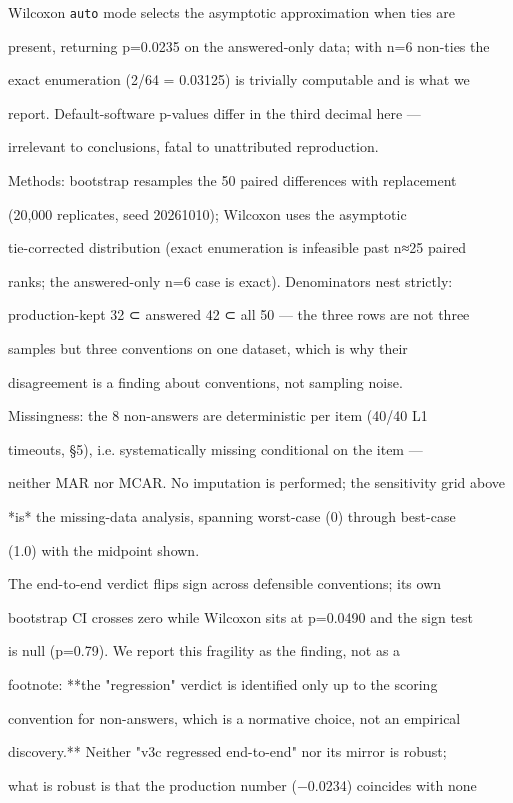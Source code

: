 \documentclass[11pt,a4paper]{article}
\begin{document}
Wilcoxon \texttt{auto} mode selects the asymptotic approximation when ties are

present, returning p=0.0235 on the answered-only data; with n=6 non-ties the

exact enumeration (2/64 = 0.03125) is trivially computable and is what we

report. Default-software p-values differ in the third decimal here —

irrelevant to conclusions, fatal to unattributed reproduction.

Methods: bootstrap resamples the 50 paired differences with replacement

(20,000 replicates, seed 20261010); Wilcoxon uses the asymptotic

tie-corrected distribution (exact enumeration is infeasible past n≈25 paired

ranks; the answered-only n=6 case is exact). Denominators nest strictly:

production-kept 32 ⊂ answered 42 ⊂ all 50 — the three rows are not three

samples but three conventions on one dataset, which is why their

disagreement is a finding about conventions, not sampling noise.

Missingness: the 8 non-answers are deterministic per item (40/40 L1

timeouts, §5), i.e. systematically missing conditional on the item —

neither MAR nor MCAR. No imputation is performed; the sensitivity grid above

*is* the missing-data analysis, spanning worst-case (0) through best-case

(1.0) with the midpoint shown.

The end-to-end verdict flips sign across defensible conventions; its own

bootstrap CI crosses zero while Wilcoxon sits at p=0.0490 and the sign test

is null (p=0.79). We report this fragility as the finding, not as a

footnote: **the "regression" verdict is identified only up to the scoring

convention for non-answers, which is a normative choice, not an empirical

discovery.** Neither "v3c regressed end-to-end" nor its mirror is robust;

what is robust is that the production number (−0.0234) coincides with none
\end{document}
